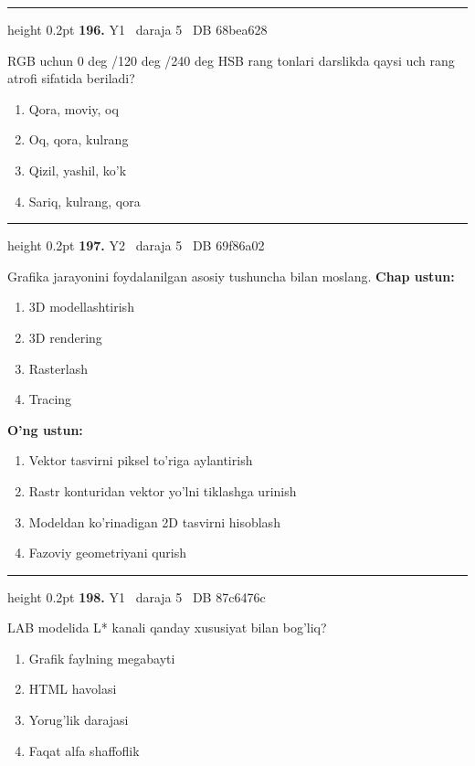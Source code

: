 \documentclass[10pt,a4paper,oneside]{article}
\begin{document}
\vspace{2mm}\hrule height 0.2pt \vspace{4mm}
\hypertarget{q196}{\textbf{\color{ink}196.}}  {\color{muted}\scriptsize Y1 \textbullet\ daraja 5 \textbullet\ DB 68bea628}
\par
RGB uchun 0 deg /120 deg /240 deg  HSB rang tonlari darslikda qaysi uch rang atrofi sifatida beriladi?
\begin{enumerate}[label=\Alph*),leftmargin=9mm]
\item Qora, moviy, oq
\item Oq, qora, kulrang
\item Qizil, yashil, ko'k
\item Sariq, kulrang, qora
\end{enumerate}
\vspace{2mm}\hrule height 0.2pt \vspace{4mm}
\hypertarget{q197}{\textbf{\color{ink}197.}}  {\color{muted}\scriptsize Y2 \textbullet\ daraja 5 \textbullet\ DB 69f86a02}
\par
Grafika jarayonini foydalanilgan asosiy tushuncha bilan moslang.
\textbf{\footnotesize Chap ustun:}
\begin{enumerate}[label=\arabic*),leftmargin=9mm]
\item 3D modellashtirish
\item 3D rendering
\item Rasterlash
\item Tracing
\end{enumerate}
\textbf{\footnotesize O'ng ustun:}
\begin{enumerate}[label=\Alph*),leftmargin=9mm]
\item Vektor tasvirni piksel to'riga aylantirish
\item Rastr konturidan vektor yo'lni tiklashga urinish
\item Modeldan ko'rinadigan 2D tasvirni hisoblash
\item Fazoviy geometriyani qurish
\end{enumerate}
\vspace{2mm}\hrule height 0.2pt \vspace{4mm}
\hypertarget{q198}{\textbf{\color{ink}198.}}  {\color{muted}\scriptsize Y1 \textbullet\ daraja 5 \textbullet\ DB 87c6476c}
\par
LAB modelida L* kanali qanday xususiyat bilan bog'liq?
\begin{enumerate}[label=\Alph*),leftmargin=9mm]
\item Grafik faylning megabayti
\item HTML havolasi
\item Yorug'lik darajasi
\item Faqat alfa shaffoflik
\end{enumerate}
\end{document}
